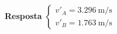 
\textbf{Resposta}
$
\begin{cases}
	v'_{A}=\SI{3.296}{\meter/\second}\\
	v'_{B}=\SI{1.763}{\meter/\second}
\end{cases}
$